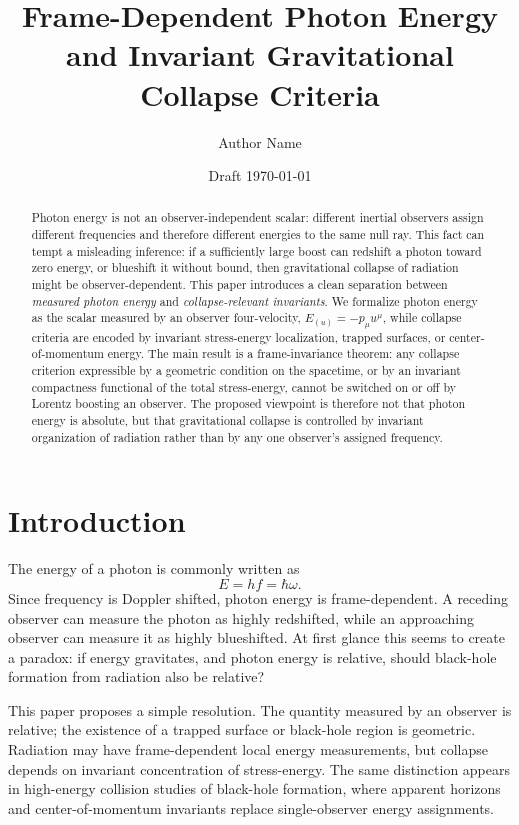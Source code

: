 \documentclass[11pt]{article}
\title{Frame-Dependent Photon Energy and Invariant Gravitational Collapse Criteria}
\author{Author Name}
\affil{Independent Research Draft}
\date{Draft \today}
\theoremstyle{remark}
\begin{document}
\maketitle

\begin{abstract}
Photon energy is not an observer-independent scalar: different inertial observers assign different frequencies and therefore different energies to the same null ray. This fact can tempt a misleading inference: if a sufficiently large boost can redshift a photon toward zero energy, or blueshift it without bound, then gravitational collapse of radiation might be observer-dependent. This paper introduces a clean separation between \emph{measured photon energy} and \emph{collapse-relevant invariants}. We formalize photon energy as the scalar measured by an observer four-velocity, $E_{(u)}=-p_\mu u^\mu$, while collapse criteria are encoded by invariant stress-energy localization, trapped surfaces, or center-of-momentum energy. The main result is a frame-invariance theorem: any collapse criterion expressible by a geometric condition on the spacetime, or by an invariant compactness functional of the total stress-energy, cannot be switched on or off by Lorentz boosting an observer. The proposed viewpoint is therefore not that photon energy is absolute, but that gravitational collapse is controlled by invariant organization of radiation rather than by any one observer's assigned frequency.
\end{abstract}

\tableofcontents

\section{Introduction}

The energy of a photon is commonly written as
\begin{equation}
E = h f = \hbar \omega .
\end{equation}
Since frequency is Doppler shifted, photon energy is frame-dependent. A receding observer can measure the photon as highly redshifted, while an approaching observer can measure it as highly blueshifted. At first glance this seems to create a paradox: if energy gravitates, and photon energy is relative, should black-hole formation from radiation also be relative?

This paper proposes a simple resolution. The quantity measured by an observer is relative; the existence of a trapped surface or black-hole region is geometric. Radiation may have frame-dependent local energy measurements, but collapse depends on invariant concentration of stress-energy. The same distinction appears in high-energy collision studies of black-hole formation, where apparent horizons and center-of-momentum invariants replace single-observer energy assignments.
\end{document}
